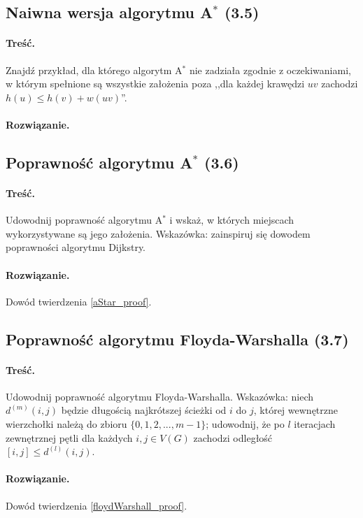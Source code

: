 \subsection{Naiwna wersja algorytmu A\texorpdfstring{$^*$}{TEXT} (3.5)}
\paragraph{Treść.}Znajdź przykład, dla 
którego algorytm A$^*$ nie zadziała zgodnie z oczekiwaniami, 
w którym spełnione
są wszystkie założenia 
poza 
,,dla każdej krawędzi $uv$ zachodzi $h(u) \leq h(v) + w(uv)$''.

\paragraph{Rozwiązanie.}%

\subsection{Poprawność algorytmu A\texorpdfstring{$^*$}{TEXT} (3.6)}
\paragraph{Treść.}Udowodnij poprawność algorytmu 
A$^*$ i wskaż, w których miejscach wykorzystywane są jego założenia.
Wskazówka: zainspiruj się dowodem poprawności algorytmu Dijkstry.

\paragraph{Rozwiązanie.}Dowód twierdzenia \ref{aStar_proof}.

\subsection{Poprawność algorytmu Floyda-Warshalla (3.7)}
\paragraph{Treść.}Udowodnij poprawność algorytmu Floyda-Warshalla. 
Wskazówka: niech 
$d^{(m)}(i, j)$ będzie długością
najkrótszej ścieżki od $i$ do $j$, której wewnętrzne wierzchołki należą
do zbioru $\{0, 1, 2, . . . , m - 1\}$; 
udowodnij, że po $l$
iteracjach zewnętrznej pętli dla każdych $i, j \in V (G)$ zachodzi 
odległość$[i, j] \leq d^{(l)}(i, j)$.

\paragraph{Rozwiązanie.}Dowód twierdzenia \ref{floydWarshall_proof}.
